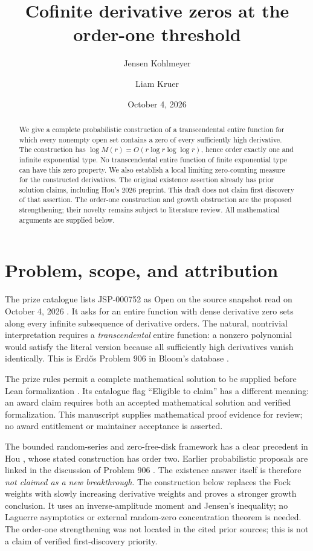 \documentclass[11pt]{article}
\title{Cofinite derivative zeros at the order-one threshold}
\author{Jensen Kohlmeyer \and Liam Kruer}
\date{October 4, 2026}
\theoremstyle{remark}
\begin{document}
\maketitle

\begin{abstract}
We give a complete probabilistic construction of a transcendental entire
function for which every nonempty open set contains a zero of every
sufficiently high derivative. The construction has
$\log M(r)=O(r\log r\log\log r)$, hence order exactly one and infinite
exponential type. No transcendental entire function of finite exponential
type can have this zero property. We also establish a local limiting
zero-counting measure for the constructed derivatives.
The original existence assertion already has prior solution claims,
including Hou's 2026 preprint. This draft does not claim first discovery
of that assertion. The order-one construction and growth obstruction are
the proposed strengthening; their novelty remains subject to literature
review. All mathematical arguments are supplied below.
\end{abstract}

\section{Problem, scope, and attribution}

The prize catalogue lists JSP-000752 as Open on the source snapshot read
on October 4, 2026 \cite{JSP}. It asks for an entire function with dense
derivative zero sets along every infinite subsequence of derivative
orders. The natural, nontrivial interpretation requires a
\emph{transcendental} entire function: a nonzero polynomial would satisfy
the literal version because all sufficiently high derivatives vanish
identically. This is Erd\H{o}s Problem 906 in Bloom's database
\cite{Bloom}.

The prize rules permit a complete mathematical solution to be supplied
before Lean formalization \cite{Rules}. Its catalogue flag
``Eligible to claim'' has a different meaning: an award claim requires
both an accepted mathematical solution and verified formalization. This manuscript supplies mathematical proof evidence for review;
no award entitlement or maintainer acceptance is asserted.

The bounded random-series and zero-free-disk framework has a clear
precedent in Hou \cite{Hou}, whose stated construction has order two.
Earlier probabilistic proposals are linked in the discussion of
Problem 906 \cite{Bloom}. The existence answer itself is therefore
\emph{not claimed as a new breakthrough}. The construction below replaces
the Fock weights with slowly increasing derivative weights and proves a
stronger growth conclusion. It uses an inverse-amplitude moment and
Jensen's inequality; no Laguerre asymptotics or external random-zero
concentration theorem is needed. The order-one strengthening was not located in the cited prior sources;
this is not a claim of verified first-discovery priority.
\end{document}
